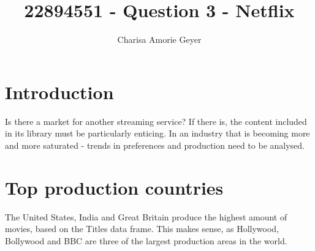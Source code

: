 \documentclass[11pt,preprint]{elsarticle}
\numberwithin{equation}{section}
\numberwithin{figure}{section}
\numberwithin{table}{section}
\begin{document}
\begin{frontmatter}  %

\title{22894551 - Question 3 - Netflix}





\author[Add1]{Charisa Amorie Geyer}





\address[Add1]{Stellenbosch University, Cape Town, South Africa}



\vspace{1cm}





\vspace{0.5cm}

\end{frontmatter}

\setcounter{footnote}{0}



\pagestyle{fancy}
\chead{}
\rhead{}
\lfoot{}
\lhead{}
\cfoot{}


\headsep 35pt %




\section{Introduction}\label{introduction}

Is there a market for another streaming service? If there is, the
content included in its library must be particularly enticing. In an
industry that is becoming more and more saturated - trends in
preferences and production need to be analysed.

\section{Top production countries}\label{top-production-countries}

The United States, India and Great Britain produce the highest amount of
movies, based on the Titles data frame. This makes sense, as Hollywood,
Bollywood and BBC are three of the largest production areas in the
world.
\end{document}
